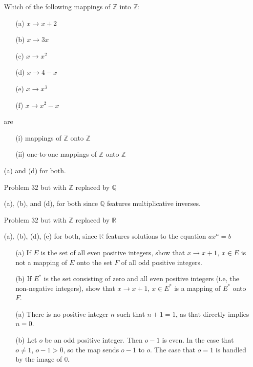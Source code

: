 \exercise
Which of the following mappings of $\mathbb{Z}$ into $\mathbb{Z}$:
\begin{itemize}
    \item[(a)]
        $x \to x +2$
    \item[(b)]
        $x \to 3x$
    \item[(c)]
        $x \to x^2$
    \item[(d)]
        $x \to 4-x$
    \item[(e)]
        $x \to x^3$
    \item[(f)]
        $x \to x^2-x$
\end{itemize}
are 
\begin{itemize}
    \item[(i)]
        mappings of $\mathbb{Z}$ onto $\mathbb{Z}$
    \item[(ii)]
        one-to-one mappings of $\mathbb{Z}$ onto $\mathbb{Z}$
\end{itemize}

\answer
(a) and (d) for both.


\exercise
Problem 32 but with $\mathbb{Z}$ replaced by $\mathbb{Q}$

\answer
(a), (b), and (d), for both since $\mathbb{Q}$ features multiplicative inverses.


\exercise
Problem 32 but with $\mathbb{Z}$ replaced by $\mathbb{R}$

\answer
(a), (b), (d), (e) for both, since $\mathbb{R}$ features solutions to the equation $ax^n = b$


\exercise
\begin{itemize}
    \item[(a)]
        If $E$ is the set of all even positive integers, show that $x \to x+1$, $x \in E$ is not a mapping of $E$ onto the set $F$ of all odd positive integers.
    \item[(b)]
        If $E^*$ is the set consisting of zero and all even positive integers (i.e, the non-negative integers), show that $x \to x+1$, $x \in E^*$ is a mapping of $E^*$ onto $F$.
\end{itemize}

\answer
\begin{itemize}
    \item[(a)]
        There is no positive integer $n$ such that $n+1 = 1$, as that directly implies $n = 0$.
    \item[(b)]
        Let $o$ be an odd positive integer. Then $o-1$ is even. In the case that $o \neq 1$, $o-1 > 0$, so the map sends $o-1$ to $o$. The case that $o = 1$ is handled by the image of $0$.
\end{itemize}



